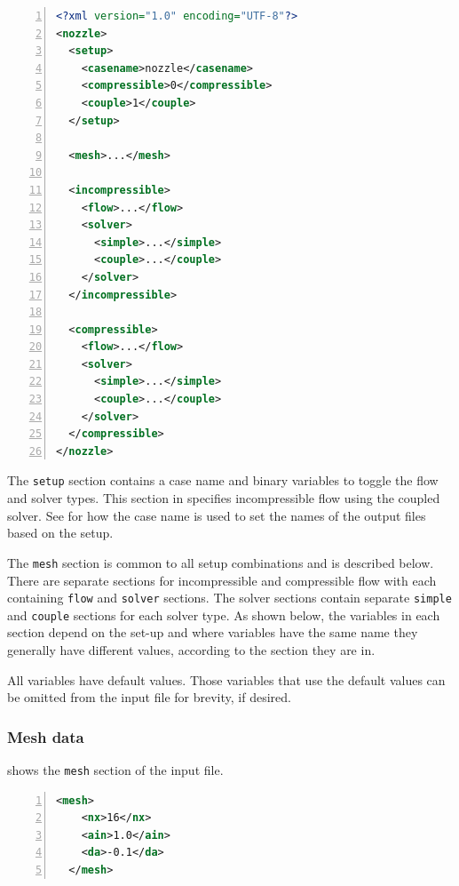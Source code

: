 \begin{lstlisting}[numbers=left, language=xml, caption=Input file main sections., label=list-xml01]
<?xml version="1.0" encoding="UTF-8"?>
<nozzle>
  <setup>
    <casename>nozzle</casename>
    <compressible>0</compressible>
    <couple>1</couple>
  </setup>

  <mesh>...</mesh>

  <incompressible>
    <flow>...</flow>
    <solver>
      <simple>...</simple>
      <couple>...</couple>
    </solver>
  </incompressible>

  <compressible>
    <flow>...</flow>
    <solver>
      <simple>...</simple>
      <couple>...</couple>
    </solver>
  </compressible>
</nozzle>
\end{lstlisting}


The {\tt setup} section contains a case name and binary variables to
toggle the flow and solver types. 
This section in  specifies incompressible flow using the coupled solver.
See  for how the case name is used to set the names of the 
output files based on the setup.

The {\tt mesh} section is common to all setup combinations and is described below.
There are separate sections for incompressible and compressible flow with
each containing {\tt flow} and {\tt solver} sections.
The solver sections contain separate {\tt simple} and {\tt couple} sections for
each solver type. As shown below, the variables in each section depend on the
set-up and where variables have the same name they generally have different values,
according to the section they are in. 

All variables have default values. Those variables that use the default values can
be omitted from the input file for brevity, if desired.


%
\subsubsection{Mesh data}

 shows the {\tt mesh} section of the input file.

\begin{lstlisting}[numbers=left, language=xml, caption=Input file mesh section., label=list-xml02]
  <mesh>
    <nx>16</nx>
    <ain>1.0</ain>
    <da>-0.1</da>
  </mesh>
\end{lstlisting}

